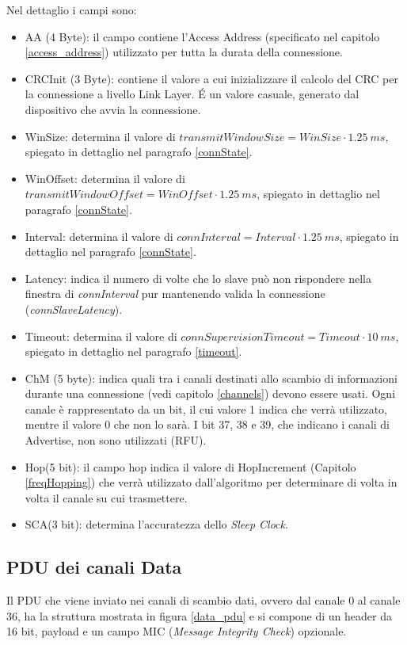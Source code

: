 Nel dettaglio i campi sono:
\begin{itemize}
\item AA (4 Byte): il campo contiene l'Access Address (specificato nel capitolo \ref{access_address}) utilizzato per tutta la durata della connessione.
\item CRCInit (3 Byte): contiene il valore a cui inizializzare il calcolo del CRC per la connessione a livello Link Layer. \'E un valore casuale, generato dal dispositivo che avvia la connessione.
\item WinSize: determina il valore di ${transmitWindowSize = WinSize \cdot 1.25\ \si{ms}}$, spiegato in dettaglio nel paragrafo \ref{connState}.
\item WinOffset: determina il valore di ${transmitWindow\mathit{Offs}et =
Win\mathit{Offs}et \cdot 1.25\ \si{ms}}$, spiegato in dettaglio nel paragrafo \ref{connState}.
\item Interval: determina il valore di ${connInterval = Interval \cdot 1.25\ \si{ms}}$, spiegato in dettaglio nel paragrafo \ref{connState}.
\item Latency: indica il numero di volte che lo slave può non rispondere nella finestra di \emph{connInterval} pur mantenendo valida la connessione (\emph{connSlaveLatency}).
\item Timeout: determina il valore di ${connSupervisionTimeout = Timeout \cdot 10\ \si{ms}}$, spiegato in dettaglio nel paragrafo \ref{timeout}.
\item ChM (5 byte): indica quali tra i canali destinati allo scambio di informazioni durante una connessione (vedi capitolo \ref{channels}) devono essere usati. Ogni canale è rappresentato da un bit, il cui valore 1 indica che verrà utilizzato, mentre il valore 0 che non lo sarà. I bit 37, 38 e 39, che indicano i canali di Advertise, non sono utilizzati (RFU).
\item Hop(5 bit): il campo hop indica il valore di HopIncrement (Capitolo \ref{freqHopping}) che verrà utilizzato dall'algoritmo per  determinare di volta in volta il canale su cui trasmettere.
\item SCA(3 bit): determina l'accuratezza dello \emph{Sleep Clock}.

\end{itemize}

\subsection{PDU dei canali Data}
Il PDU che viene inviato nei canali di scambio dati, ovvero dal canale 0 al canale 36, ha la struttura mostrata in figura \ref{data_pdu} e si compone di un header da 16 bit, payload e un campo MIC (\emph{Message Integrity Check}) opzionale.

